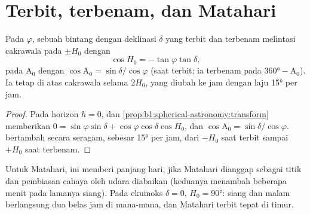 \section{Terbit, terbenam, dan Matahari}

\begin{proposition}\label{prop:b1:spherical-astronomy:rising}
Pada  $\varphi$, sebuah bintang dengan deklinasi $\delta$ yang terbit dan terbenam melintasi cakrawala pada  $\pm H_0$ dengan
\[
  \cos H_0 = -\tan\varphi\tan\delta ,
\]
pada  $\mathrm{A}_0$ dengan $\cos\mathrm{A}_0 = \sin\delta/\cos\varphi$ (saat terbit; ia terbenam pada $\ang{360} - \mathrm{A}_0$). Ia tetap di atas cakrawala selama $2H_0$, yang diubah ke jam dengan laju \ang{15} per jam.
\end{proposition}

\begin{proof}
Pada horizon $h = 0$, dan \cref{prop:b1:spherical-astronomy:transform} memberikan $0 = \sin\varphi\sin\delta + \cos\varphi\cos\delta\cos H_0$, dan $\cos\mathrm{A}_0 = \sin\delta/\cos\varphi$.  bertambah secara seragam, sebesar \ang{15} per jam, dari $-H_0$ saat terbit sampai $+H_0$ saat terbenam.
\end{proof}

Untuk Matahari, ini memberi panjang hari, jika Matahari dianggap sebagai titik dan pembiasan cahaya oleh udara diabaikan (keduanya menambah beberapa menit pada lamanya siang). Pada ekuinoks $\delta = 0$, $H_0 = \ang{90}$: siang dan malam berlangsung dua belas jam di mana-mana, dan Matahari terbit tepat di timur.

